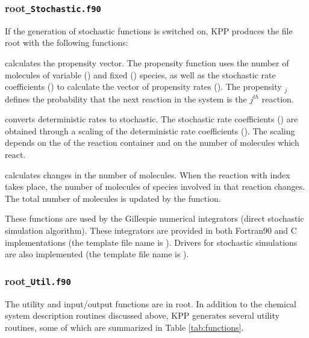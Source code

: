 \documentclass[twoside]{article}
\newcommand{\kpproot}{{\sc root}}
\begin{document}
\subsubsection{\kpproot{\tt\_Stochastic.f90}}
\label{sec:output-stochastic}

If the generation of stochastic functions is switched on, KPP produces
the file \kpproot{} with the following functions:

 calculates the propensity vector. The propensity
function uses the number of molecules of variable () and
fixed () species, as well as the stochastic rate
coefficients () to calculate the vector of propensity rates
(). The propensity $_j$ defines the
probability that the next reaction in the system is the $j^{th}$
reaction.

 converts deterministic rates to stochastic. The
stochastic rate coefficients () are obtained through a scaling
of the deterministic rate coefficients ().  The scaling depends
on the  of the reaction container and on the number of
molecules which react.

 calculates changes in the number of molecules.
When the reaction with index  takes place, the number of
molecules of species involved in that reaction changes. The total number
of molecules  is updated by the function.

These functions are used by the Gillespie numerical integrators (direct
stochastic simulation algorithm). These integrators are provided in both
Fortran90 and C implementations (the template file name is
). Drivers for stochastic simulations are also
implemented (the template file name is ).

\subsubsection{\kpproot{\tt\_Util.f90}}
\label{sec:output-utility}

The utility and input/output functions are in \kpproot{}.
In addition to the chemical system description routines discussed above,
KPP generates several utility routines, some of which are summarized in
Table \ref{tab:functions}.
\end{document}
